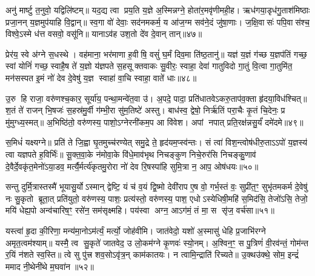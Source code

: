 अनु॑ मार्ष्टु त॒नुवो॒ यद्विलि॑ष्टम्॥ यद॒द्य त्वा प्रय॒ति य॒ज्ञे अ॒स्मिन्नग्ने॒ होता॑र॒मवृ॑णीमही॒ह। ऋध॑गया॒डृध॑गु॒ताश॑मिष्ठाः प्रजा॒नन् य॒ज्ञमुप॑याहि वि॒द्वान्॥ स्व॒गा वो॑ देवाः॒ सद॑नमकर्म॒ य आ॑ज॒ग्म सव॑ने॒दं जु॑षा॒णाः। ज॒क्षि॒वासः॑ पपि॒वास॑श्च॒ विश्वे॒ऽस्मे ध॑त्त वसवो॒ वसू॑नि॥ यानाऽव॑ह उश॒तो दे॑व दे॒वान् तान्॥४७॥

प्रेर॑य॒ स्वे अ॑ग्ने स॒धस्थे। वह॑माना॒ भर॑माणा ह॒वीषि॒ वसुं॑ घ॒र्मं दिव॒मा ति॑ष्ठ॒तानु॑॥ यज्ञ॑ य॒ज्ञं ग॑च्छ य॒ज्ञप॑तिं गच्छ॒ स्वां योनिं॑ गच्छ॒ स्वाहै॒ष ते॑ य॒ज्ञो य॑ज्ञपते स॒हसूक्तवाकः सु॒वीरः॒ स्वाहा॒ देवा॑ गातुविदो गा॒तुं वि॒त्वा गा॒तुमि॑त॒ मन॑सस्पत इ॒मं नो॑ देव दे॒वेषु॑ य॒ज्ञ स्वाहा॑ वा॒चि स्वाहा॒ वाते॑ धाः॥४८॥

{\anuvakamend[{कृ॒णो॒तु॒ तान॒ष्टाच॑त्वारिशच्च॥44 (38)॥}]}

उ॒रु हि राजा॒ वरु॑णश्च॒कार॒ सूर्या॑य॒ पन्था॒मन्वे॑त॒वा उ॑। अ॒पदे॒ पादा॒ प्रति॑धातवेऽकरु॒ताप॑व॒क्ता हृ॑दया॒विध॑श्चित्॥ श॒तं ते॑ राजन् भि॒षजः॑ स॒हस्र॑मु॒र्वी ग॑म्भी॒रा सु॑म॒तिष्टे॑ अस्तु। बाध॑स्व॒ द्वेषो॒ निर्\mbox{}ऋ॑तिं परा॒चैः कृ॒तं चि॒देनः॒ प्र मु॑मुग्ध्य॒स्मत्॥ अ॒भिष्ठि॑तो॒ वरु॑णस्य॒ पाशो॒ऽग्नेरनी॑कम॒प आ वि॑वेश। अपां नपात् प्रति॒रक्ष॑न्नसु॒र्यं॑ दमे॑दमे॥४९॥

स॒मिधं॑ यक्ष्यग्ने॥ प्रति॑ ते जि॒ह्वा घृ॒तमुच्च॑रण्येत् समु॒द्रे ते॒ हृद॑यम॒प्स्व॑न्तः। सं त्वा॑ विश॒न्त्वोष॑धीरु॒ताऽऽपो॑ य॒ज्ञस्य॑ त्वा यज्ञपते ह॒विर्भिः॑॥ सू॒क्त॒वा॒के न॑मोवा॒के वि॑धे॒माव॑भृथ निचङ्कुण निचे॒रुर॑सि निचङ्कु॒णाव॑ दे॒वैर्दे॒वकृ॑त॒मेनो॑ऽया॒डव॒ मर्त्यै॒र्मर्त्य॑कृतमु॒रोरा नो॑ देव रि॒षस्पा॑हि सुमि॒त्रा न॒ आप॒ ओष॑धयः॥५०॥

सन्तु दुर्मि॒त्रास्तस्मै॑ भूयासु॒र्योऽस्मान् द्वेष्टि॒ यं च॑ व॒यं द्वि॒ष्मो देवी॑राप ए॒ष वो॒ गर्भ॒स्तं वः॒ सुप्री॑त॒ꣳ॒ सुभृ॑तमकर्म दे॒वेषु॑ नः सु॒कृतो ब्रूता॒त् प्रति॑युतो॒ वरु॑णस्य॒ पाशः॒ प्रत्य॑स्तो॒ वरु॑णस्य॒ पाश॒ एधोऽस्येधिषी॒महि॑ स॒मिद॑सि॒ तेजो॑ऽसि॒ तेजो॒ मयि॑ धेह्य॒पो अन्व॑चारिष॒ꣳ॒ रसे॑न॒ सम॑सृक्ष्महि। पय॑स्वा अग्न॒ आऽग॑मं॒ तं मा॒ स सृ॑ज॒ वर्च॑सा॥५१॥

{\anuvakamend[{दमे॑दम॒ ओष॑धय॒ आ षट् च॑॥45 (39)॥}]}

यस्त्वा॑ हृ॒दा की॒रिणा॒ मन्य॑मा॒नोऽम॑र्त्यं॒ मर्त्यो॒ जोह॑वीमि। जात॑वेदो॒ यशो॑ अ॒स्मासु॑ धेहि प्र॒जाभि॑रग्ने अमृत॒त्वम॑श्याम्॥ यस्मै॒ त्व सु॒कृते॑ जातवेद॒ उ लो॒कम॑ग्ने कृ॒णवः॑ स्यो॒नम्। अ॒श्विन॒ꣳ॒ स पु॒त्रिणं॑ वी॒रव॑न्तं॒ गोम॑न्त र॒यिं न॑शते स्व॒स्ति॥ त्वे सु पु॑त्त्र शव॒सोऽवृ॑त्र॒न् काम॑कातयः। न त्वामि॒न्द्राति॑ रिच्यते॥ उ॒क्थउ॑क्थे॒ सोम॒ इन्द्रं॑ ममाद नी॒थेनी॑थे म॒घवा॑न॥५२॥

